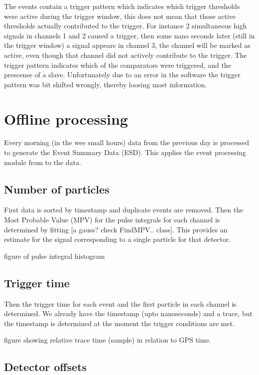 The \hisparc events contain a trigger pattern which indicates which trigger thresholds were active during the trigger window, this does not mean that those active thresholds actually contributed to the trigger. For instance 2 simultaneous high signals in channels 1 and 2 caused a trigger, then some nano seconds later (still in the trigger window) a signal appears in channel 3, the channel will be marked as active, even though that channel did not actively contribute to the trigger. The trigger pattern indicates which of the comparators were triggered, and the prescense of a slave. Unfortunately due to an error in the software the trigger pattern was bit shifted wrongly, thereby loosing most information.


\section{Offline processing}

Every morning (in the wee small hours) data from the previous day is processed to generate the Event Summary Data (ESD). This applies the event processing module from \sapphire to the data.

\subsection{Number of particles}

First data is sorted by timestamp and duplicate events are removed. Then the Most Probable Value (MPV) for the pulse integrals for each channel is determined by fitting [a gauss? check FindMPV.. class]. This provides an estimate for the signal corresponding to a single particle for that detector.

figure of pulse integral histogram


\subsection{Trigger time}

Then the trigger time for each event and the first particle in each channel is determined. We already have the \gps timestamp (upto nanoseconds) and a trace, but the timestamp is determined at the moment the trigger conditions are met. 

figure showing  relative trace time (sample)  in relation to GPS time.


\subsection{Detector offsets}

